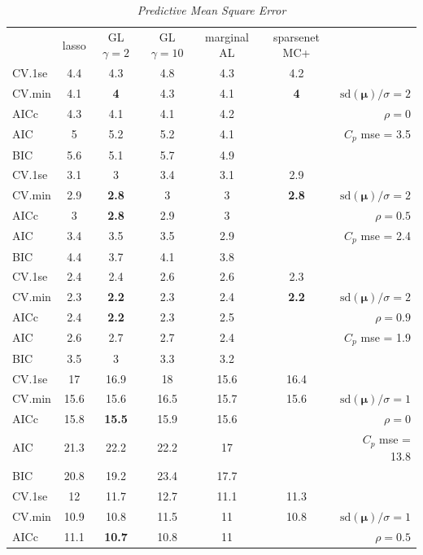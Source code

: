 \documentclass[12pt]{article}
\newcommand{\mr}[1]{\mathrm{#1}}
\newcommand{\bm}[1]{\mathbf{#1}}
\begin{document}
\begin{table}[p]\vspace{-.5cm}
\caption[l]{\it Predictive Mean Square Error\hfill}
\vspace{-.5cm}
\small{}
\begin{center}
\begin{tabular}{l*{5}{c}|r}
 & lasso & GL $\gamma=2$ & GL $\gamma=10$ & marginal AL & sparsenet MC+  &  \\
\cline{1-7}
CV.1se & 4.4 & 4.3 & 4.8 & 4.3 & 4.2 &\\
CV.min & 4.1 & {\bf 4} & 4.3 & 4.1 & {\bf 4} &  $\mr{sd}(\bm{\mu})/\sigma=2$ \\
AICc & 4.3 & 4.1 & 4.1 & 4.2 & & $\rho=0$ \\
AIC & 5 & 5.2 & 5.2 & 4.1 & & $C_p$ mse = 3.5 \\
BIC & 5.6 & 5.1 & 5.7 & 4.9 & & \\
 \hline 
CV.1se & 3.1 & 3 & 3.4 & 3.1 & 2.9 &\\
CV.min & 2.9 & {\bf 2.8} & 3 & 3 & {\bf 2.8} &  $\mr{sd}(\bm{\mu})/\sigma=2$ \\
AICc & 3 & {\bf 2.8} & 2.9 & 3 & & $\rho=0.5$ \\
AIC & 3.4 & 3.5 & 3.5 & 2.9 & & $C_p$ mse = 2.4 \\
BIC & 4.4 & 3.7 & 4.1 & 3.8 & & \\
 \hline 
CV.1se & 2.4 & 2.4 & 2.6 & 2.6 & 2.3 &\\
CV.min & 2.3 & {\bf 2.2} & 2.3 & 2.4 & {\bf 2.2} &  $\mr{sd}(\bm{\mu})/\sigma=2$ \\
AICc & 2.4 & {\bf 2.2} & 2.3 & 2.5 & & $\rho=0.9$ \\
AIC & 2.6 & 2.7 & 2.7 & 2.4 & & $C_p$ mse = 1.9 \\
BIC & 3.5 & 3 & 3.3 & 3.2 & & \\
 \hline 
CV.1se & 17 & 16.9 & 18 & 15.6 & 16.4 &\\
CV.min & 15.6 & 15.6 & 16.5 & 15.7 & 15.6 &  $\mr{sd}(\bm{\mu})/\sigma=1$ \\
AICc & 15.8 & {\bf 15.5} & 15.9 & 15.6 & & $\rho=0$ \\
AIC & 21.3 & 22.2 & 22.2 & 17 & & $C_p$ mse = 13.8 \\
BIC & 20.8 & 19.2 & 23.4 & 17.7 & & \\
 \hline 
CV.1se & 12 & 11.7 & 12.7 & 11.1 & 11.3 &\\
CV.min & 10.9 & 10.8 & 11.5 & 11 & 10.8 &  $\mr{sd}(\bm{\mu})/\sigma=1$ \\
AICc & 11.1 & {\bf 10.7} & 10.8 & 11 & & $\rho=0.5$ \\

\end{tabular}
\end{center}
\end{table}
\end{document}

